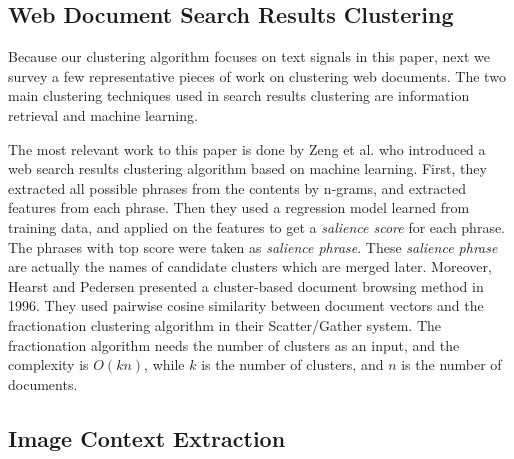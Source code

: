 
\subsection{Web Document Search Results Clustering}

Because our clustering algorithm focuses on text signals in this paper,
next we survey a few representative pieces of work on clustering web documents.
The two main clustering techniques
used in search results clustering are information retrieval and machine
learning\cite{Leouski1996,ZamirE98,ZamirE99}.

The most relevant work to this paper is done by
Zeng et al.\cite{Zeng2004} who introduced a web search results clustering algorithm
based on machine learning. First, they extracted all possible phrases from the
contents by n-grams, and extracted features from each phrase. Then they used
a regression model learned from training data, and applied on the features to
get a \textit{salience score} for each phrase. The phrases with top score were taken
as \textit{salience phrase}. These \textit{salience phrase} are actually the
names of candidate clusters which are merged later.
Moreover, Hearst and Pedersen\cite{Hearst1996} presented a cluster-based document
browsing method in 1996. They used pairwise cosine similarity between document
vectors and the fractionation clustering algorithm in their Scatter/Gather
system. The fractionation algorithm needs the number of clusters as an input, and the
complexity is $O(kn)$, while $k$ is the number of clusters, and $n$
is the number of documents.



\subsection{Image Context Extraction}

